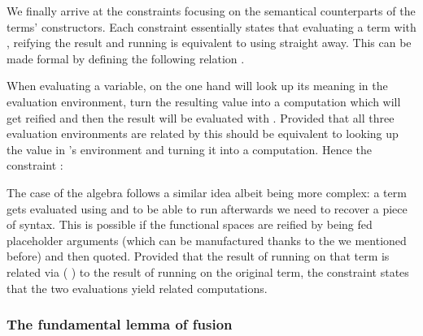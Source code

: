 \begin{agdasnippet}
\addtolength{\leftskip}{\parindent}
\end{agdasnippet}
We finally arrive at the constraints focusing on the semantical counterparts
of the terms' constructors. Each constraint essentially states that evaluating
a term with , reifying the result and running  is equivalent to
using  straight away. This can be made formal by defining the following
relation .

\begin{agdasnippet}
\addtolength{\leftskip}{\parindent}
\end{agdasnippet}
When evaluating a variable, on the one hand 
will look up its meaning in the evaluation environment, turn the resulting value into
a computation which will get reified and then the result will be evaluated with .
Provided that all three evaluation environments are related by  this should
be equivalent to looking up the value in 's environment and turning it into a
computation. Hence the constraint :

\begin{agdasnippet}
\addtolength{\leftskip}{\parindent}
\end{agdasnippet}
The case of the algebra follows a similar idea albeit being more complex:
a term gets evaluated using  and to be able to run 
afterwards we need to recover a piece of syntax. This is possible if the
 functional spaces are reified by being fed placeholder  arguments
(which can be manufactured thanks to the  we mentioned before) and
then quoted. Provided that the result of running  on that term is
related via    (  ) to the result
of running  on the original term, the  constraint states
that the two evaluations yield related computations.

\begin{agdasnippet}
\addtolength{\leftskip}{\parindent}
\end{agdasnippet}

\subsubsection{The fundamental lemma of fusion}

